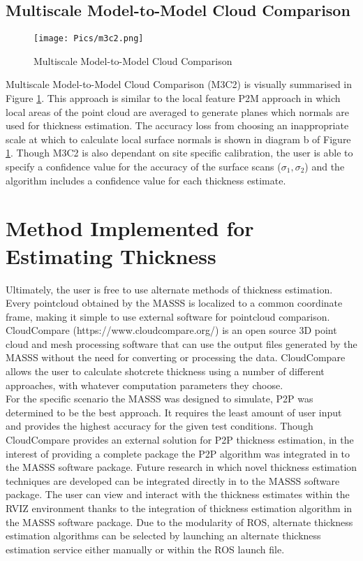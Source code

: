 \subsection{Multiscale Model-to-Model Cloud Comparison}
\begin{figure}[h!]
    \centering
    \texttt{[image: Pics/m3c2.png]}
    \caption{Multiscale Model-to-Model Cloud Comparison \cite{accurate3d}}
    \label{fig:m3c2}
\end{figure}

Multiscale Model-to-Model Cloud Comparison (M3C2) is visually summarised in Figure \ref{fig:m3c2}. This approach is similar to the local feature P2M approach in which local areas of the point cloud are averaged to generate planes which normals are used for thickness estimation. The accuracy loss from choosing an inappropriate scale at which to calculate local surface normals is shown in diagram b of Figure \ref{fig:m3c2}. Though M3C2 is also dependant on site specific calibration, the user is able to specify a confidence value for the accuracy of the surface scans ($\sigma_1,\sigma_2$) and the algorithm includes a confidence value for each thickness estimate.\\

\section{Method Implemented for Estimating Thickness}
Ultimately, the user is free to use alternate methods of thickness estimation. Every pointcloud obtained by the MASSS is localized to a common coordinate frame, making it simple to use external software for pointcloud comparison. CloudCompare (https://www.cloudcompare.org/) is an open source 3D point cloud and mesh processing software that can use the output files generated by the MASSS without the need for converting or processing the data. CloudCompare allows the user to calculate shotcrete thickness using a number of different approaches, with whatever computation parameters they choose.\\

For the specific scenario the MASSS was designed to simulate, P2P was determined to be the best approach. It requires the least amount of user input and provides the highest accuracy for the given test conditions. Though CloudCompare provides an external solution for P2P thickness estimation, in the interest of providing a complete package the P2P algorithm was integrated in to the MASSS software package. Future research in which novel thickness estimation techniques are developed can be integrated directly in to the MASSS software package. The user can view and interact with the thickness estimates within the RVIZ environment thanks to the integration of thickness estimation algorithm in the MASSS software package. Due to the modularity of ROS, alternate thickness estimation algorithms can be selected by launching an alternate thickness estimation service either manually or within the ROS launch file.\\